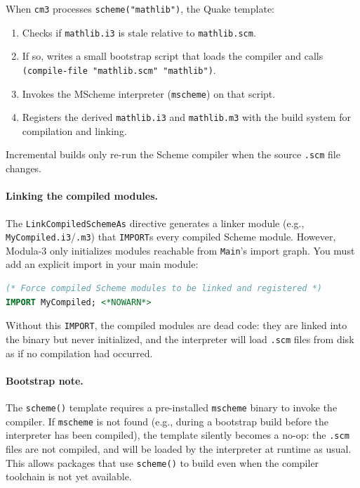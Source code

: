 \documentclass[12pt]{report}
\begin{document}
When \texttt{cm3} processes \texttt{scheme("mathlib")}, the Quake
template:

\begin{enumerate}
\item Checks if \texttt{mathlib.i3} is stale relative to \texttt{mathlib.scm}.
\item If so, writes a small bootstrap script that loads the compiler
  and calls \texttt{(compile-file "mathlib.scm" "mathlib")}.
\item Invokes the MScheme interpreter (\texttt{mscheme}) on that
  script.
\item Registers the derived \texttt{mathlib.i3} and \texttt{mathlib.m3}
  with the build system for compilation and linking.
\end{enumerate}

Incremental builds only re-run the Scheme compiler when the source
\texttt{.scm} file changes.

\paragraph{Linking the compiled modules.}
The \texttt{LinkCompiledSchemeAs} directive generates a linker module
(e.g., \texttt{MyCompiled.i3}/\texttt{.m3}) that \texttt{IMPORT}s
every compiled Scheme module.  However, Modula-3 only initializes
modules reachable from \texttt{Main}'s import graph.  You must add an
explicit import in your main module:

\begin{lstlisting}[language=Modula3]
(* Force compiled Scheme modules to be linked and registered *)
IMPORT MyCompiled; <*NOWARN*>
\end{lstlisting}

\noindent Without this \texttt{IMPORT}, the compiled modules are dead
code: they are linked into the binary but never initialized, and the
interpreter will load \texttt{.scm} files from disk as if no
compilation had occurred.

\paragraph{Bootstrap note.}
The \texttt{scheme()} template requires a pre-installed \texttt{mscheme}
binary to invoke the compiler.  If \texttt{mscheme} is not found (e.g.,
during a bootstrap build before the interpreter has been compiled),
the template silently becomes a no-op: the \texttt{.scm} files are
not compiled, and will be loaded by the interpreter at runtime as
usual.  This allows packages that use \texttt{scheme()} to build even
when the compiler toolchain is not yet available.
\end{document}
